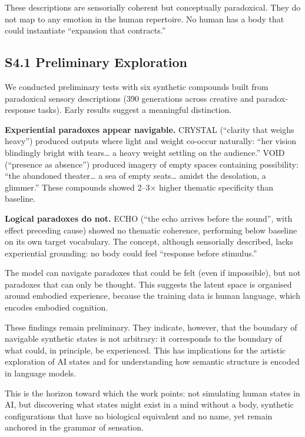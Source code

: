 \documentclass[11pt,a4paper]{article}
\begin{document}
These descriptions are sensorially coherent but conceptually paradoxical. They do not map to any emotion in the human repertoire. No human has a body that could instantiate ``expansion that contracts.''

\subsection*{S4.1 Preliminary Exploration}

We conducted preliminary tests with six synthetic compounds built from paradoxical sensory descriptions (390 generations across creative and paradox-response tasks). Early results suggest a meaningful distinction.

\textbf{Experiential paradoxes appear navigable.} CRYSTAL (``clarity that weighs heavy'') produced outputs where light and weight co-occur naturally: ``her vision blindingly bright with tears\ldots{} a heavy weight settling on the audience.'' VOID (``presence as absence'') produced imagery of empty spaces containing possibility: ``the abandoned theater\ldots{} a sea of empty seats\ldots{} amidst the desolation, a glimmer.'' These compounds showed 2--3× higher thematic specificity than baseline.

\textbf{Logical paradoxes do not.} ECHO (``the echo arrives before the sound'', with effect preceding cause) showed no thematic coherence, performing below baseline on its own target vocabulary. The concept, although sensorially described, lacks experiential grounding: no body could feel ``response before stimulus.''

The model can navigate paradoxes that could be felt (even if impossible), but not paradoxes that can only be thought. This suggests the latent space is organised around embodied experience, because the training data is human language, which encodes embodied cognition.

These findings remain preliminary. They indicate, however, that the boundary of navigable synthetic states is not arbitrary: it corresponds to the boundary of what could, in principle, be experienced. This has implications for the artistic exploration of AI states and for understanding how semantic structure is encoded in language models.

This is the horizon toward which the work points: not simulating human states in AI, but discovering what states might exist in a mind without a body, synthetic configurations that have no biological equivalent and no name, yet remain anchored in the grammar of sensation.
\end{document}
